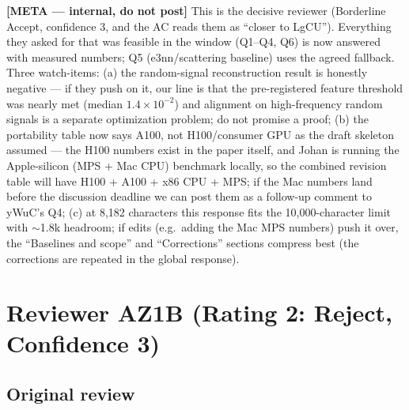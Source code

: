 \documentclass[10pt]{article}
\newenvironment{metacomment}%
  {\par\medskip\noindent\begingroup%
   \setlength{\fboxsep}{8pt}%
   \noindent\begin{lrbox}{\metabox}\begin{minipage}{\dimexpr\linewidth-2\fboxsep\relax}%
   \small\sffamily\color{metablue}%
   \textbf{[META --- internal, do not post]}\quad}%
  {\end{minipage}\end{lrbox}%
   \noindent\colorbox{metabg}{\usebox{\metabox}}\endgroup\par\medskip}
\begin{document}
\begin{metacomment}
This is the decisive reviewer (Borderline Accept, confidence 3, and the AC
reads them as ``closer to LgCU''). Everything they asked for that was
feasible in the window (Q1--Q4, Q6) is now answered with measured numbers;
Q5 (e3nn/scattering baseline) uses the agreed fallback. Three watch-items:
(a) the random-signal reconstruction result is honestly negative --- if they
push on it, our line is that the pre-registered feature threshold was nearly
met (median $1.4\times10^{-2}$) and alignment on high-frequency random
signals is a separate optimization problem; do not promise a proof;
(b) the portability table now says A100, not H100/consumer GPU as the draft
skeleton assumed --- the H100 numbers exist in the paper itself, and Johan is
running the Apple-silicon (MPS + Mac CPU) benchmark locally, so the combined
revision table will have H100 + A100 + x86 CPU + MPS; if the Mac numbers land
before the discussion deadline we can post them as a follow-up comment to
yWuC's Q4;
(c) at 8{,}182 characters this response fits the 10{,}000-character limit
with $\sim$1.8k headroom; if edits (e.g.\ adding the Mac MPS numbers) push it
over, the ``Baselines and scope'' and ``Corrections'' sections compress best
(the corrections are repeated in the global response).
\end{metacomment}

\section{Reviewer AZ1B (Rating 2: Reject, Confidence 3)}

\subsection{Original review}
\end{document}
